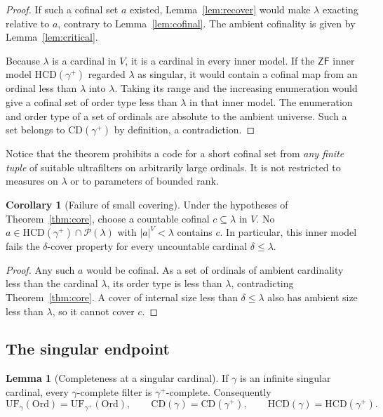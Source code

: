 \documentclass[11pt,letterpaper]{article}
\theoremstyle{definition}
\newtheorem{lemma}[definition]{Lemma}
\newtheorem{corollary}[definition]{Corollary}
\newcommand{\ZF}{\mathsf{ZF}}
\newcommand{\Ord}{\mathrm{Ord}}
\newcommand{\CD}{\mathrm{CD}}
\newcommand{\HCD}{\mathrm{HCD}}
\newcommand{\UF}{\mathrm{UF}}
\newcommand{\Pow}{\mathcal{P}}
\begin{document}
\begin{proof}
If such a cofinal set $a$ existed, Lemma~\ref{lem:recover} would make $\lambda$ exacting relative to $a$, contrary to Lemma~\ref{lem:cofinal}. The ambient cofinality is given by Lemma~\ref{lem:critical}.

Because $\lambda$ is a cardinal in $V$, it is a cardinal in every inner model. If the $\ZF$ inner model $\HCD(\gamma^+)$ regarded $\lambda$ as singular, it would contain a cofinal map from an ordinal less than $\lambda$ into $\lambda$. Taking its range and the increasing enumeration would give a cofinal set of order type less than $\lambda$ in that inner model. The enumeration and order type of a set of ordinals are absolute to the ambient universe. Such a set belongs to $\CD(\gamma^+)$ by definition, a contradiction.
\end{proof}

Notice that the theorem prohibits a code for a short cofinal set from \emph{any finite tuple} of suitable ultrafilters on arbitrarily large ordinals. It is not restricted to measures on $\lambda$ or to parameters of bounded rank.

\begin{corollary}[Failure of small covering]\label{cor:nocover}
Under the hypotheses of Theorem~\ref{thm:core}, choose a countable cofinal $c\subseteq\lambda$ in $V$. No $a\in\HCD(\gamma^+)\cap\Pow(\lambda)$ with $|a|^V<\lambda$ contains $c$. In particular, this inner model fails the $\delta$-cover property for every uncountable cardinal $\delta\leq\lambda$.
\end{corollary}

\begin{proof}
Any such $a$ would be cofinal. As a set of ordinals of ambient cardinality less than the cardinal $\lambda$, its order type is less than $\lambda$, contradicting Theorem~\ref{thm:core}. A cover of internal size less than $\delta\leq\lambda$ also has ambient size less than $\lambda$, so it cannot cover $c$.
\end{proof}

\subsection{The singular endpoint}

\begin{lemma}[Completeness at a singular cardinal]\label{lem:singular}
If $\gamma$ is an infinite singular cardinal, every $\gamma$-complete filter is $\gamma^+$-complete. Consequently
\[
 \UF_\gamma(\Ord)=\UF_{\gamma^+}(\Ord),\qquad
 \CD(\gamma)=\CD(\gamma^+),\qquad
 \HCD(\gamma)=\HCD(\gamma^+).
\]
\end{lemma}
\end{document}

